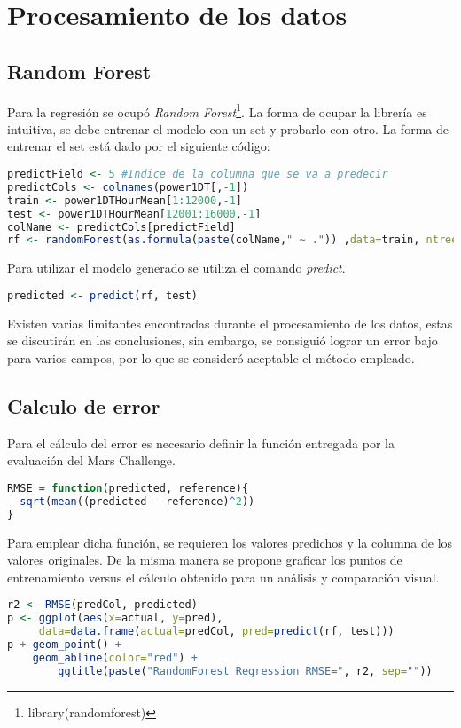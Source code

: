 \documentclass[../Main.tex]{subfiles}
\begin{document}
\section{Procesamiento de los datos}

\subsection{Random Forest}
Para la regresión se ocupó \textit{Random Forest}\footnote{library(randomforest)}. La forma de ocupar la librería es intuitiva, se debe entrenar el modelo con un set y probarlo con otro. La forma de entrenar el set está dado por el siguiente código:
\newline \par
\begin{lstlisting}[language=R]
predictField <- 5 #Indice de la columna que se va a predecir
predictCols <- colnames(power1DT[,-1])
train <- power1DTHourMean[1:12000,-1]
test <- power1DTHourMean[12001:16000,-1]
colName <- predictCols[predictField]
rf <- randomForest(as.formula(paste(colName," ~ .")) ,data=train, ntree=10)
\end{lstlisting}
Para utilizar el modelo generado se utiliza el comando \textit{predict}.
\newline \par
\begin{lstlisting}[language=R]
predicted <- predict(rf, test)
\end{lstlisting}
Existen varias limitantes encontradas durante el procesamiento de los datos, estas se discutirán en las conclusiones, sin embargo, se consiguió lograr un error bajo para varios campos, por lo que se consideró aceptable el método empleado.
\subsection{Calculo de error}
Para el cálculo del error es necesario definir la función entregada por la evaluación del Mars Challenge.
\newline \par
\begin{lstlisting}[language=R]
RMSE = function(predicted, reference){
  sqrt(mean((predicted - reference)^2))
}
\end{lstlisting}
Para emplear dicha función, se requieren los valores predichos y la columna de los valores originales. De la misma manera se propone graficar los puntos de entrenamiento versus el cálculo obtenido para un análisis y comparación visual.
\newline \par
\begin{lstlisting}[language=R]
r2 <- RMSE(predCol, predicted)
p <- ggplot(aes(x=actual, y=pred), 
	 data=data.frame(actual=predCol, pred=predict(rf, test)))
p + geom_point() +  
	geom_abline(color="red") + 
    	ggtitle(paste("RandomForest Regression RMSE=", r2, sep=""))
\end{lstlisting}
\end{document}
